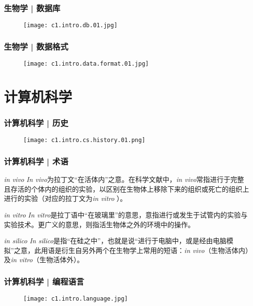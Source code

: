 \begin{frame}
  \frametitle{生物学 | \alert{数据库}}
  \begin{figure}
    \centering
    \texttt{[image: c1.intro.db.01.jpg]}
  \end{figure}
\end{frame}

\begin{frame}
  \frametitle{生物学 | 数据格式}
  \begin{figure}
    \centering
    \texttt{[image: c1.intro.data.format.01.jpg]}
  \end{figure}
\end{frame}

\section{计算机科学}
\begin{frame}
  \frametitle{计算机科学 | 历史}
  \begin{figure}
    \centering
    \texttt{[image: c1.intro.cs.history.01.png]}
  \end{figure}
\end{frame}

\begin{frame}
  \frametitle{计算机科学 | \alert{术语}}
  \begin{block}{\textit{in vivo}}
  \textit{In vivo}为拉丁文“在活体内”之意。在科学文献中，\textit{in vivo}常指进行于完整且存活的个体内的组织的实验，以区别在生物体上移除下来的组织或死亡的组织上进行的实验（对应的拉丁文为\textit{in vitro }）。
  \end{block}
  \pause
  \begin{block}{\textit{in vitro}}
    \textit{In vitro}是拉丁语中“在玻璃里”的意思，意指进行或发生于试管内的实验与实验技术。更广义的意思，则指活生物体之外的环境中的操作。
  \end{block}
  \pause
  \begin{block}{\textit{in silico}}
    \textit{In
    silico}是指“在硅之中”，也就是说“进行于电脑中，或是经由电脑模拟”之意，此用语是衍生自另外两个在生物学上常用的短语：\textit{in vivo}（生物活体内）及\textit{in vitro}（生物活体外）。
  \end{block}
\end{frame}

\begin{frame}
  \frametitle{计算机科学 | 编程语言}
  \begin{figure}
    \centering
    \texttt{[image: c1.intro.language.jpg]}
  \end{figure}
\end{frame}

